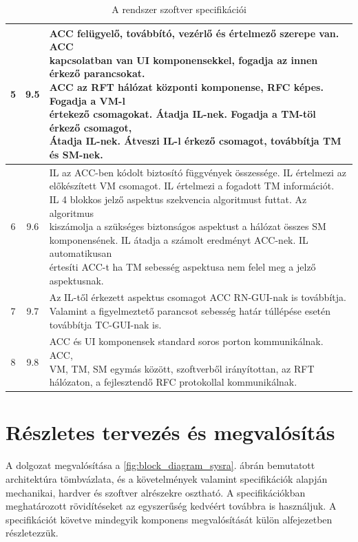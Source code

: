 \documentclass[a4paper,12pt]{article}
\begin{document}
\begin{table}[!htbp]
{\begin{tabular}{|c|c|l|}
		5 & 9.5 & \specialcell{ACC felügyelő, továbbító, vezérlő és értelmező szerepe van. ACC 
		                    \\kapcsolatban van UI komponensekkel, fogadja az innen érkező parancsokat.
							\\ACC az RFT hálózat központi komponense, RFC képes. Fogadja a VM-l
							\\értekező csomagokat. Átadja IL-nek. Fogadja a TM-töl érkező csomagot,
							\\ Átadja IL-nek. Átveszi IL-l érkező csomagot, továbbítja TM és SM-nek.}\\ \hline
		6 & 9.6 & \specialcell{IL az ACC-ben kódolt biztosító függvények összessége. IL értelmezi az 
		                    \\előkészített VM csomagot. IL értelmezi a fogadott TM információt.
							\\IL 4 blokkos jelző aspektus szekvencia algoritmust futtat. Az algoritmus
							\\kiszámolja a szükséges biztonságos aspektust a hálózat összes SM 
							\\komponensének. IL átadja a számolt eredményt ACC-nek. IL automatikusan
							\\értesíti ACC-t ha TM sebesség aspektusa nem felel meg a jelző aspektusnak.}\\ \hline
		7 & 9.7 & \specialcell{Az IL-től érkezett aspektus csomagot ACC RN-GUI-nak is továbbítja. 
							\\Valamint a figyelmeztető parancsot sebesség határ túllépése esetén 
							\\továbbítja TC-GUI-nak is.} \\ \hline
		8 & 9.8 &\specialcell{ACC és UI komponensek standard soros porton kommunikálnak. ACC,  
		                    \\VM, TM, SM egymás között, szoftverből irányítottan, az RFT 
							\\hálózaton, a fejlesztendő RFC protokollal kommunikálnak.}\\ \hline
    \end{tabular}
    }
    \caption[Szoftver specifikáció]{A rendszer szoftver specifikációi}
    \label{tab:softspec}
\end{table}




\newpage
\section{Részletes tervezés és megvalósítás}
A dolgozat megvalósítása a \ref{fig:block_diagram_sysra}. ábrán bemutatott architektúra tömbvázlata, és a követelmények valamint specifikációk alapján mechanikai, hardver és szoftver alrészekre osztható.
A specifikációkban meghatározott rövidítéseket az egyszerűség kedvéért továbbra is használjuk. 
A specifikációt követve mindegyik komponens megvalósítását külön alfejezetben részletezzük.
\end{document}
